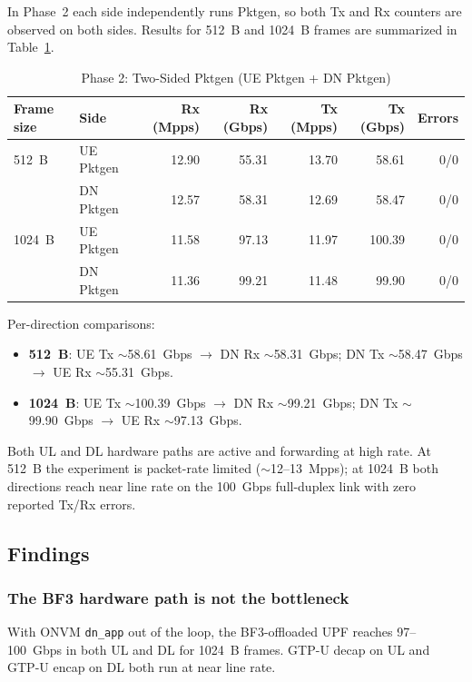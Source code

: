 \documentclass[conference]{IEEEtran}
\newcommand{\code}[1]{\nolinkurl{#1}}
\begin{document}
In Phase~2 each side independently runs Pktgen, so both Tx and Rx
counters are observed on both sides.  Results for 512~B and 1024~B
frames are summarized in Table~\ref{tab:twosided}.

\begin{table}[t]
  \centering
  \caption{Phase 2: Two-Sided Pktgen (UE Pktgen + DN Pktgen)}
  \label{tab:twosided}
  \begin{tabular}{@{}llrrrrr@{}}
    \toprule
    Frame size & Side       & Rx (Mpps) & Rx (Gbps) & Tx (Mpps) & Tx (Gbps) & Errors \\
    \midrule
    512~B      & UE Pktgen  & 12.90 & 55.31  & 13.70 & 58.61  & 0/0 \\
               & DN Pktgen  & 12.57 & 58.31  & 12.69 & 58.47  & 0/0 \\
    \midrule
    1024~B     & UE Pktgen  & 11.58 & 97.13  & 11.97 & 100.39 & 0/0 \\
               & DN Pktgen  & 11.36 & 99.21  & 11.48 & 99.90  & 0/0 \\
    \bottomrule
  \end{tabular}
\end{table}

Per-direction comparisons:
\begin{itemize}
  \item \textbf{512~B}: UE Tx $\sim$58.61~Gbps $\to$ DN Rx
        $\sim$58.31~Gbps; DN Tx $\sim$58.47~Gbps $\to$ UE Rx
        $\sim$55.31~Gbps.
  \item \textbf{1024~B}: UE Tx $\sim$100.39~Gbps $\to$ DN Rx
        $\sim$99.21~Gbps; DN Tx $\sim$99.90~Gbps $\to$ UE Rx
        $\sim$97.13~Gbps.
\end{itemize}

Both UL and DL hardware paths are active and forwarding at high rate.
At 512~B the experiment is packet-rate limited ($\sim$12--13~Mpps);
at 1024~B both directions reach near line rate on the 100~Gbps
full-duplex link with zero reported Tx/Rx errors.

\subsection{Findings}

\subsubsection{The BF3 hardware path is not the bottleneck}
With ONVM \code{dn_app} out of the loop, the BF3-offloaded UPF reaches
97--100~Gbps in both UL and DL for 1024~B frames.  GTP-U decap on UL
and GTP-U encap on DL both run at near line rate.
\end{document}
